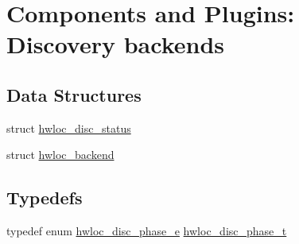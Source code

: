 \hypertarget{a00228}{}\section{Components and Plugins\+: Discovery backends}
\label{a00228}
\subsection*{Data Structures}
\begin{DoxyCompactItemize}
\item 
struct \hyperlink{a00370}{hwloc\+\_\+disc\+\_\+status}
\item 
struct \hyperlink{a00374}{hwloc\+\_\+backend}
\end{DoxyCompactItemize}
\subsection*{Typedefs}
\begin{DoxyCompactItemize}
\item 
typedef enum \hyperlink{a00228_ga8c314121c2fc478161bcce758688b9a1}{hwloc\+\_\+disc\+\_\+phase\+\_\+e} \hyperlink{a00228_ga3beef9f01f1c08c5700aec066fcec025}{hwloc\+\_\+disc\+\_\+phase\+\_\+t}
\end{DoxyCompactItemize}
